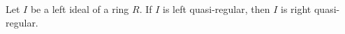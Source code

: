 Let $I$ be a left ideal of a ring $R$. If $I$ is left quasi-regular, then $I$ is right quasi-regular.
